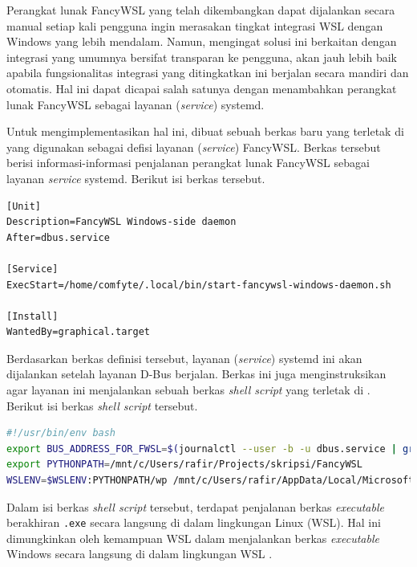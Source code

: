 Perangkat lunak FancyWSL yang telah dikembangkan dapat dijalankan secara manual setiap kali pengguna ingin merasakan tingkat integrasi WSL dengan Windows yang lebih mendalam. Namun, mengingat solusi ini berkaitan dengan integrasi yang umumnya bersifat transparan ke pengguna, akan jauh lebih baik apabila fungsionalitas integrasi yang ditingkatkan ini berjalan secara mandiri dan otomatis. Hal ini dapat dicapai salah satunya dengan menambahkan perangkat lunak FancyWSL sebagai layanan (\textit{service}) systemd.

Untuk mengimplementasikan hal ini, dibuat sebuah berkas baru yang terletak di  yang digunakan sebagai defisi layanan (\textit{service}) FancyWSL. Berkas tersebut berisi informasi-informasi penjalanan perangkat lunak FancyWSL sebagai layanan \textit{service} systemd. Berikut isi berkas tersebut.

\begin{lstlisting}
[Unit]
Description=FancyWSL Windows-side daemon
After=dbus.service

[Service]
ExecStart=/home/comfyte/.local/bin/start-fancywsl-windows-daemon.sh

[Install]
WantedBy=graphical.target
\end{lstlisting}

Berdasarkan berkas definisi tersebut, layanan (\textit{service}) systemd ini akan dijalankan setelah layanan D-Bus berjalan. Berkas ini juga menginstruksikan agar layanan ini menjalankan sebuah berkas \textit{shell script} yang terletak di . Berikut isi berkas \textit{shell script} tersebut.

\begin{lstlisting}[language=bash]
#!/usr/bin/env bash
export BUS_ADDRESS_FOR_FWSL=$(journalctl --user -b -u dbus.service | grep 'dbus-daemon' | tail -n 1 | grep -P -o 'tcp\:host=\S+,port=\d+(?:,family=(?:ipv4|ipv6))?')
export PYTHONPATH=/mnt/c/Users/rafir/Projects/skripsi/FancyWSL
WSLENV=$WSLENV:PYTHONPATH/wp /mnt/c/Users/rafir/AppData/Local/Microsoft/WindowsApps/python3.exe -m fwsl_daemon --bus-address="$BUS_ADDRESS_FOR_FWSL"
\end{lstlisting}

Dalam isi berkas \textit{shell script} tersebut, terdapat penjalanan berkas \textit{executable} berakhiran \verb|.exe| secara langsung di dalam lingkungan Linux (WSL). Hal ini dimungkinkan oleh kemampuan WSL dalam menjalankan berkas \textit{executable} Windows secara langsung di dalam lingkungan WSL \cite{msdocs-run-windows-tools-from-linux}.

